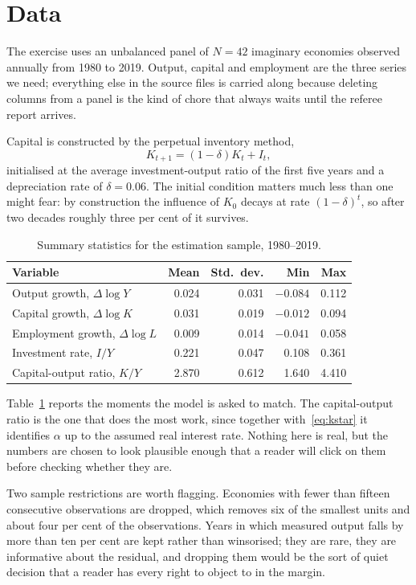\section{Data}
\label{sec:data}

The exercise uses an unbalanced panel of $N = 42$ imaginary economies observed
annually from 1980 to 2019. Output, capital and employment are the three series
we need; everything else in the source files is carried along because deleting
columns from a panel is the kind of chore that always waits until the referee
report arrives.

Capital is constructed by the perpetual inventory method,
\begin{equation}
  K_{t+1} = (1 - \delta) K_{t} + I_{t},
  \label{eq:pim}
\end{equation}
initialised at the average investment-output ratio of the first five years and a
depreciation rate of $\delta = 0.06$. The initial condition matters much less
than one might fear: by construction the influence of $K_{0}$ decays at rate
$(1 - \delta)^{t}$, so after two decades roughly three per cent of it survives.

\begin{table}[ht]
  \centering
  \begin{tabular}{lrrrr}
    \hline
    Variable & Mean & Std.\ dev. & Min & Max \\
    \hline
    Output growth, $\Delta \log Y$   & 0.024 & 0.031 & $-0.084$ & 0.112 \\
    Capital growth, $\Delta \log K$  & 0.031 & 0.019 & $-0.012$ & 0.094 \\
    Employment growth, $\Delta \log L$ & 0.009 & 0.014 & $-0.041$ & 0.058 \\
    Investment rate, $I / Y$         & 0.221 & 0.047 & 0.108 & 0.361 \\
    Capital-output ratio, $K / Y$    & 2.870 & 0.612 & 1.640 & 4.410 \\
    \hline
  \end{tabular}
  \caption{Summary statistics for the estimation sample, 1980--2019.}
  \label{tab:summary}
\end{table}

Table~\ref{tab:summary} reports the moments the model is asked to match. The
capital-output ratio is the one that does the most work, since together
with~\eqref{eq:kstar} it identifies $\alpha$ up to the assumed real interest
rate. Nothing here is real, but the numbers are chosen to look plausible enough
that a reader will click on them before checking whether they are.

Two sample restrictions are worth flagging. Economies with fewer than fifteen
consecutive observations are dropped, which removes six of the smallest units
and about four per cent of the observations. Years in which measured output
falls by more than ten per cent are kept rather than winsorised; they are rare,
they are informative about the residual, and dropping them would be the sort of
quiet decision that a reader has every right to object to in the margin.

